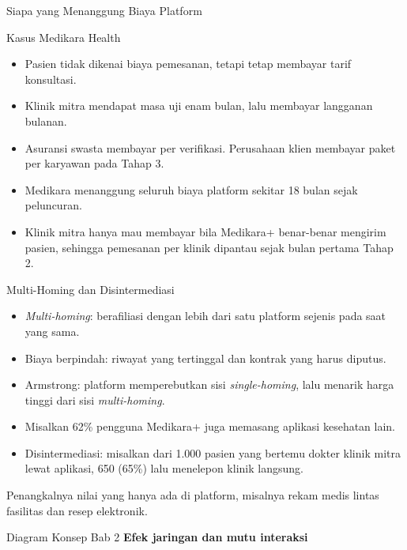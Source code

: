 \documentclass[aspectratio=169, table, 12pt]{beamer}
\begin{document}
\begin{frame}{{\Large Siapa yang Menanggung Biaya Platform}}
  \begin{block}{Kasus Medikara Health}
    \small
    \begin{itemize}
      \item Pasien tidak dikenai biaya pemesanan, tetapi tetap membayar tarif konsultasi.
      \item Klinik mitra mendapat masa uji enam bulan, lalu membayar langganan bulanan.
      \item Asuransi swasta membayar per verifikasi. Perusahaan klien membayar paket per karyawan pada Tahap 3.
      \item Medikara menanggung seluruh biaya platform sekitar 18 bulan sejak peluncuran.
      \item Klinik mitra hanya mau membayar bila Medikara+ benar-benar mengirim pasien, sehingga pemesanan per klinik dipantau sejak bulan pertama Tahap 2.
    \end{itemize}
  \end{block}
\end{frame}

\begin{frame}{{\Large Multi-Homing dan Disintermediasi}}
  \begin{itemize}
    \item \textit{Multi-homing}: berafiliasi dengan lebih dari satu platform sejenis pada saat yang sama.
    \item Biaya berpindah: riwayat yang tertinggal dan kontrak yang harus diputus.
    \item Armstrong: platform memperebutkan sisi \textit{single-homing}, lalu menarik harga tinggi dari sisi \textit{multi-homing}.
    \item Misalkan 62\% pengguna Medikara+ juga memasang aplikasi kesehatan lain.
    \item Disintermediasi: misalkan dari 1.000 pasien yang bertemu dokter klinik mitra lewat aplikasi, 650 (65\%) lalu menelepon klinik langsung.
  \end{itemize}
  \vspace{2pt}
  {\footnotesize Penangkalnya nilai yang hanya ada di platform, misalnya rekam medis lintas fasilitas dan resep elektronik.\par}
\end{frame}

\begin{frame}{{\Large Diagram Konsep Bab 2}}
  \centering
  {\small\bfseries Efek jaringan dan mutu interaksi}\par\medskip
\end{frame}
\end{document}
